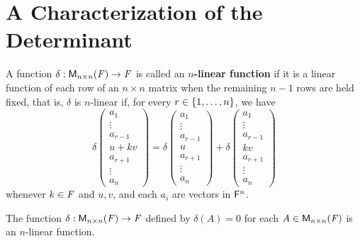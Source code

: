 \section{A Characterization of the Determinant}\label{sec:4.5}

\begin{defn}\label{4.5.1}
  A function \(\delta : \ms[n][n][\F] \to \F\) is called an \textbf{\(n\)-linear function} if it is a linear function of each row of an \(n \times n\) matrix when the remaining \(n - 1\) rows are held fixed, that is, \(\delta\) is \(n\)-linear if, for every \(r \in \left\lbrace1, \dots, n\right\rbrace\), we have
  \[
    \delta\begin{pmatrix}
      a_1       \\
      \vdots    \\
      a_{r - 1} \\
      u + kv    \\
      a_{r + 1} \\
      \vdots    \\
      a_n
    \end{pmatrix} = \delta\begin{pmatrix}
      a_1       \\
      \vdots    \\
      a_{r - 1} \\
      u         \\
      a_{r + 1} \\
      \vdots    \\
      a_n
    \end{pmatrix} + \delta\begin{pmatrix}
      a_1       \\
      \vdots    \\
      a_{r - 1} \\
      kv        \\
      a_{r + 1} \\
      \vdots    \\
      a_n
    \end{pmatrix}
  \]
  whenever \(k \in \mathit{F}\) and \(u, v\), and each \(a_i\) are vectors in \(\mathsf{F}^n\).
\end{defn}

\begin{eg}\label{4.5.2}
  The function \(\delta : \ms[n][n][\F] \to \F\) defined by \(\delta(A) = 0\) for each \(A \in \ms[n][n][\F]\) is an \(n\)-linear function.
\end{eg}

